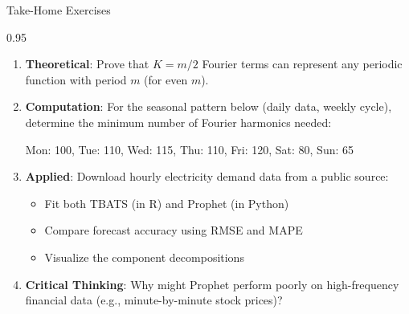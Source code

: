 \documentclass[9pt, aspectratio=169, t]{beamer}
\begin{document}
\begin{frame}{Take-Home Exercises}
    \begin{cminipage}{0.95\textwidth}
    {\footnotesize
    \begin{enumerate}\setlength{\itemsep}{2pt}
        \item \textbf{Theoretical}: Prove that $K = m/2$ Fourier terms can represent any periodic function with period $m$ (for even $m$).

        \item \textbf{Computation}: For the seasonal pattern below (daily data, weekly cycle), determine the minimum number of Fourier harmonics needed:
            \begin{center}
            Mon: 100, Tue: 110, Wed: 115, Thu: 110, Fri: 120, Sat: 80, Sun: 65
            \end{center}

        \item \textbf{Applied}: Download hourly electricity demand data from a public source:
            \begin{itemize}\setlength{\itemsep}{0pt}
                \item Fit both TBATS (in R) and Prophet (in Python)
                \item Compare forecast accuracy using RMSE and MAPE
                \item Visualize the component decompositions
            \end{itemize}

        \item \textbf{Critical Thinking}: Why might Prophet perform poorly on high-frequency financial data (e.g., minute-by-minute stock prices)?
    \end{enumerate}
    }
    \end{cminipage}
\end{frame}
\end{document}
